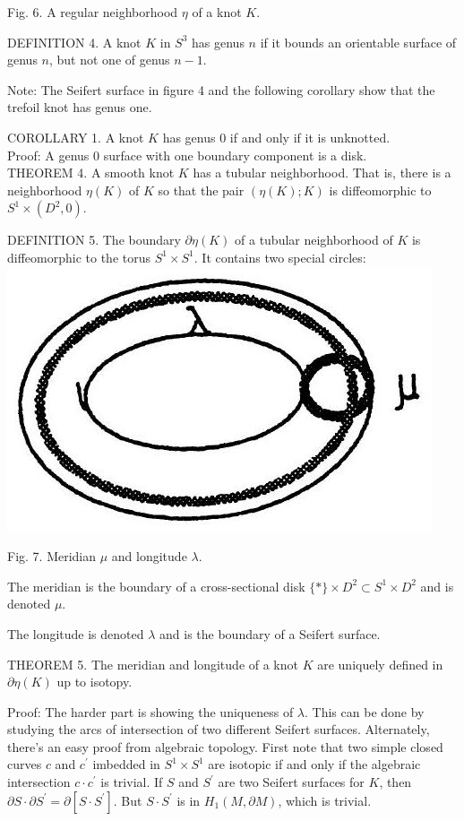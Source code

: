 \documentclass[10pt, letterpaper]{article}
\begin{document}
Fig. 6. A regular neighborhood $\eta$ of a knot $K$.

DEFINITION 4. A knot $K$ in $S^{3}$ has genus $n$ if it bounds an orientable surface of genus $n$, but not one of genus $n-1$.

Note: The Seifert surface in figure 4 and the following corollary show that the trefoil knot has genus one.

COROLLARY 1. A knot $K$ has genus 0 if and only if it is unknotted.\\
Proof: A genus 0 surface with one boundary component is a disk.\\
THEOREM 4. A smooth knot $K$ has a tubular neighborhood. That is, there is a neighborhood $\eta(K)$ of $K$ so that the pair $(\eta(K) ; K)$ is diffeomorphic to $S^{1} \times\left(D^{2}, 0\right)$.

DEFINITION 5. The boundary $\partial \eta(K)$ of a tubular neighborhood of $K$ is diffeomorphic to the torus $S^{1} \times S^{1}$. It contains two special circles:\\
\includegraphics[scale=0.2, center]{2025_05_21_037de704f595ce642d3eg-080}

Fig. 7. Meridian $\mu$ and longitude $\lambda$.

The meridian is the boundary of a cross-sectional disk $\{*\} \times D^{2} \subset S^{1} \times D^{2}$ and is denoted $\mu$.

The longitude is denoted $\lambda$ and is the boundary of a Seifert surface.

THEOREM 5. The meridian and longitude of a knot $K$ are uniquely defined in $\partial \eta(K)$ up to isotopy.

Proof: The harder part is showing the uniqueness of $\lambda$. This can be done by studying the arcs of intersection of two different Seifert surfaces. Alternately, there's an easy proof from algebraic topology. First note that two simple closed curves $c$ and $c^{\prime}$ imbedded in $S^{1} \times S^{1}$ are isotopic if and only if the algebraic intersection $c \cdot c^{\prime}$ is trivial. If $S$ and $S^{\prime}$ are two Seifert surfaces for $K$, then $\partial S \cdot \partial S^{\prime}=\partial\left[S \cdot S^{\prime}\right]$. But $S \cdot S^{\prime}$ is in $H_{1}(M, \partial M)$, which is trivial.
\end{document}
